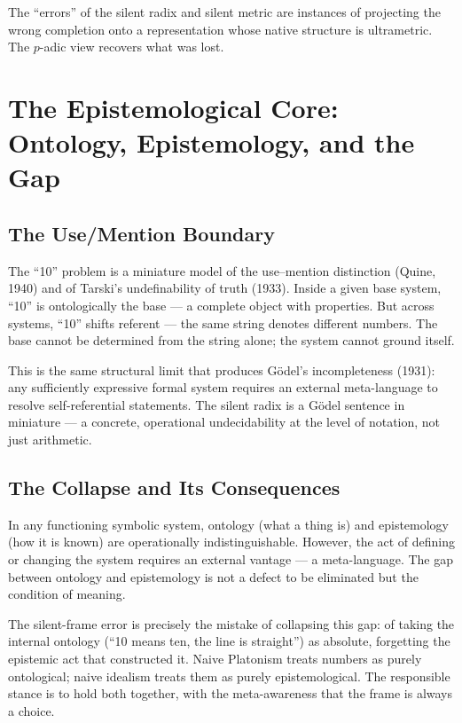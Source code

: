 \documentclass[12pt,a4paper]{article}
\theoremstyle{definition}
\theoremstyle{remark}
\begin{document}
The ``errors'' of the silent radix and silent metric are instances of projecting
the wrong completion onto a representation whose native structure is ultrametric.
The $p$-adic view recovers what was lost.

\section{The Epistemological Core: Ontology, Epistemology, and the Gap}

\subsection{The Use/Mention Boundary}

The ``10'' problem is a miniature model of the use--mention distinction (Quine,
1940) and of Tarski's undefinability of truth (1933). Inside a given base system,
``10'' is ontologically the base --- a complete object with properties. But across
systems, ``10'' shifts referent --- the same string denotes different numbers. The
base cannot be determined from the string alone; the system cannot ground itself.

This is the same structural limit that produces G\"{o}del's incompleteness (1931):
any sufficiently expressive formal system requires an external meta-language to
resolve self-referential statements. The silent radix is a G\"{o}del sentence in
miniature --- a concrete, operational undecidability at the level of notation, not
just arithmetic.

\subsection{The Collapse and Its Consequences}

In any functioning symbolic system, ontology (what a thing is) and epistemology
(how it is known) are operationally indistinguishable. However, the act of defining
or changing the system requires an external vantage --- a meta-language. The gap
between ontology and epistemology is not a defect to be eliminated but the
condition of meaning.

The silent-frame error is precisely the mistake of collapsing this gap: of taking
the internal ontology (``10 means ten, the line is straight'') as absolute,
forgetting the epistemic act that constructed it. Naive Platonism treats numbers as
purely ontological; naive idealism treats them as purely epistemological. The
responsible stance is to hold both together, with the meta-awareness that the frame
is always a choice.
\end{document}
